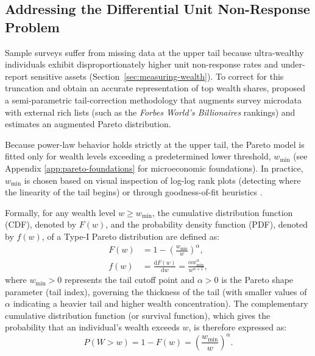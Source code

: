\subsection{Addressing the Differential Unit Non-Response Problem}\label{sec:vermeulen}
Sample surveys suffer from missing data at the upper tail because ultra-wealthy individuals exhibit disproportionately higher unit non-response rates and under-report sensitive assets (Section~\ref{sec:measuring-wealth}). To correct for this truncation and obtain an accurate representation of top wealth shares, \citet{vermeulen2018} proposed a semi-parametric tail-correction methodology that augments survey microdata with external rich lists (such as the \textit{Forbes World's Billionaires} rankings) and estimates an augmented Pareto distribution.

Because power-law behavior holds strictly at the upper tail, the Pareto model is fitted only for wealth levels exceeding a predetermined lower threshold, $w_{\min}$ (see Appendix \ref{app:pareto-foundations} for microeconomic foundations). In practice, $w_{\min}$ is chosen based on visual inspection of log-log rank plots (detecting where the linearity of the tail begins) or through goodness-of-fit heuristics \citep[e.g.,][]{clauset2009power,vermeulen2018}.

Formally, for any wealth level $w \ge w_{\min}$, the cumulative distribution function (CDF), denoted by $F(w)$, and the probability density function (PDF), denoted by $f(w)$, of a Type-I Pareto distribution are defined as:
\begin{align}
    F(w) &= 1 - \left(\frac{w_{\min}}{w}\right)^\alpha, \label{eq:pareto_cdf} \\
    f(w) &= \frac{\mathrm{d}F(w)}{\mathrm{d}w} = \frac{\alpha w_{\min}^\alpha}{w^{\alpha + 1}}, \label{eq:pareto_pdf}
\end{align}
where $w_{\min} > 0$ represents the tail cutoff point and $\alpha > 0$ is the Pareto shape parameter (tail index), governing the thickness of the tail (with smaller values of $\alpha$ indicating a heavier tail and higher wealth concentration). The complementary cumulative distribution function (or survival function), which gives the probability that an individual's wealth exceeds $w$, is therefore expressed as:
\begin{equation}
    P(W > w) = 1 - F(w) = \left(\frac{w_{\min}}{w}\right)^\alpha.
    \label{eq:pareto_survival}
\end{equation}

